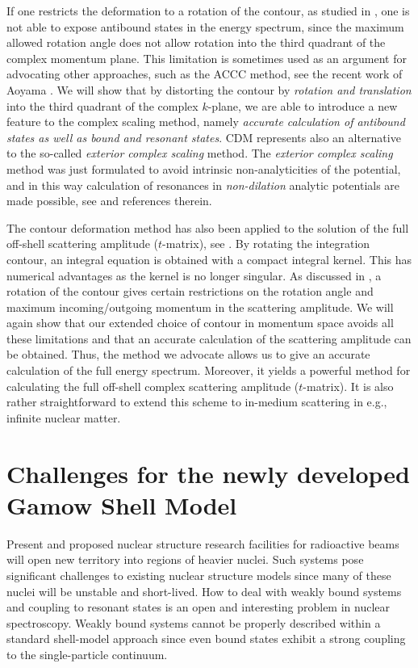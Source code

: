 If one restricts the deformation to a rotation of the contour,
as studied in \cite{brayshaw,nuttal,stelbovics,nuttal1,tikto}, 
one is not able to expose antibound states in the
energy spectrum, since the maximum allowed rotation angle does not allow rotation into the
third quadrant of the complex momentum plane. This limitation is sometimes used as an 
argument  for advocating other approaches, such as the ACCC method, see the recent work
of Aoyama  \cite{aoyama}. 
We will show that by distorting the contour by  
\emph{rotation and translation}  into the third quadrant of the complex $k$-plane, we 
are able to introduce a new feature to the complex scaling method, namely 
\emph{accurate calculation of antibound states as well as bound and resonant states}. 
CDM represents also an alternative to the so-called \emph{exterior complex scaling} method. 
The \emph{exterior complex scaling} method
was just formulated to avoid intrinsic non-analyticities of the potential, and in this way 
calculation of resonances in \emph{non-dilation} analytic potentials are made possible, see
\cite{moise} and references therein.  

The contour deformation method has also been applied to the solution of the
full off-shell scattering amplitude ($t$-matrix), see \cite{afnan1,nuttal, stelbovics,afnan}. 
By rotating the integration contour, an integral equation is obtained with a 
compact integral kernel. This has numerical advantages as the kernel is no longer
singular. As discussed in \cite{nuttal}, a rotation of the contour gives certain
restrictions on the rotation angle and maximum incoming/outgoing momentum in
the scattering amplitude. We will again show that our extended choice of contour in momentum 
space avoids all these limitations and that an accurate calculation of the
scattering amplitude can be obtained. 
Thus, the method we advocate allows us to give 
an accurate calculation of the full energy spectrum. Moreover, it yields  
a powerful method for calculating the full off-shell complex scattering amplitude ($t$-matrix). 
It is also rather straightforward to extend
this scheme to in-medium scattering in e.g., infinite nuclear matter.

\section{Challenges for the newly developed Gamow Shell Model}

Present and proposed nuclear structure research facilities
for radioactive beams 
will open new territory into regions of heavier nuclei.
Such systems pose significant challenges to existing 
nuclear structure models since many of
these nuclei will be unstable and short-lived. How to deal with weakly
bound systems and coupling to resonant states is an open and interesting problem in
nuclear spectroscopy. Weakly bound systems cannot be properly  described within a 
standard shell-model approach since even bound states exhibit a strong coupling to
the single-particle continuum.

